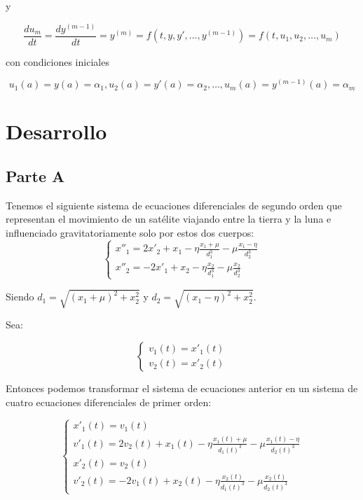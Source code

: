 \documentclass[titlepage,a4paper]{article}
\begin{document}
			y

			\begin{equation}
				\frac{du_{m}}{dt}=\frac{dy^{(m-1)}}{dt}=y^{(m)}=f(t,y,y',\dots,y^{(m-1)})=f(t,u_{1},u_{2},\dots,u_{m})
			\end{equation}

			con condiciones iniciales

			\begin{equation}
				u_{1}(a)=y(a)=\alpha_{1}, u_{2}(a)=y'(a)=\alpha_{2},\dots,u_{m}(a)=y^{(m-1)}(a)=\alpha_{m}
			\end{equation}
\section{Desarrollo}\label{sec:desarrollo}
	\subsection{Parte A}\label{sec:parteA}

		Tenemos el siguiente sistema de ecuaciones diferenciales de segundo orden que representan el movimiento de un satélite
		viajando entre la tierra y la luna e influenciado gravitatoriamente solo por estos dos cuerpos:
		\begin{equation}
			\begin{cases}
				x''_{1} = 2x'_{2} + x_{1} - \eta\frac{x_{1} + \mu}{d_{1}^{3}} - \mu\frac{x_{1}-\eta}{d_{2}^{3}}\\
				x''_{2} = -2x'_{1} + x_{2} - \eta\frac{x_{2}}{d_{1}^{3}} - \mu\frac{x_{2}}{d_{2}^{3}}
			\end{cases}
		\end{equation}

		Siendo $d_{1}=\sqrt{(x_{1}+\mu)^{2} + x_{2}^{2}}$ y $d_{2}=\sqrt{(x_{1}-\eta)^{2} + x_{2}^{2}}$.

		Sea:

		\begin{equation}
			\begin{cases}
				v_{1}(t) = x'_{1}(t)\\
				v_{2}(t) = x'_{2}(t)
			\end{cases}
		\end{equation}

		Entonces podemos transformar el sistema de ecuaciones anterior en un sistema de cuatro ecuaciones 
		diferenciales de primer orden:

		\begin{equation}
			\begin{cases}
				x'_{1}(t) = v_{1}(t)\\
				v'_{1}(t) = 2v_{2}(t) + x_{1}(t) - \eta\frac{x_{1}(t) + \mu}{d_{1}(t)^{3}} - \mu\frac{x_{1}(t) - \eta}{d_{2}(t)^{3}}\\
				x'_{2}(t) = v_{2}(t)\\				
				v'_{2}(t) = -2v_{1}(t) + x_{2}(t) - \eta\frac{x_{2}(t)}{d_{1}(t)^{3}} - \mu\frac{x_{2}(t)}{d_{2}(t)^{3}}
			\end{cases}
		\end{equation}
\end{document}

